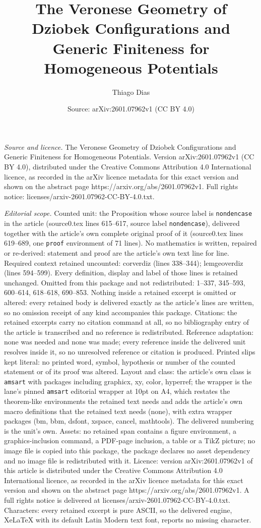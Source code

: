 \documentclass[10pt,a4paper]{amsart}
\title[The Veronese Geometry of Dziobek Configurations and Generic ]{The Veronese Geometry of Dziobek Configurations and Generic Finiteness for Homogeneous Potentials}
\author{Thiago Dias}
\date{Source: arXiv:2601.07962v1 (CC BY 4.0)}
\begin{document}
\maketitle

\noindent\emph{Source and licence.} The Veronese Geometry of Dziobek Configurations and Generic Finiteness for Homogeneous Potentials. Version arXiv:2601.07962v1 (CC BY 4.0), distributed under the Creative Commons Attribution 4.0 International licence, as recorded in the arXiv licence metadata for this exact version and shown on the abstract page https://arxiv.org/abs/2601.07962v1. Full rights notice: licenses/arxiv-2601.07962-CC-BY-4.0.txt.\par\smallskip

\noindent\textit{Editorial scope.} Counted unit: the Proposition whose source label is \texttt{nondencase} in the article (source0.tex lines 615--617, source label \texttt{nondencase}), delivered together with the article's own complete original proof of it (source0.tex lines 619--689, one \texttt{proof} environment of 71 lines). No mathematics is written, repaired or re-derived: statement and proof are the article's own text line for line. Required context retained uncounted: corverdiz (lines 338--344); lemgeoverdiz (lines 594--599). Every definition, display and label of those lines is retained unchanged. Omitted from this package and not redistributed: 1--337, 345--593, 600--614, 618--618, 690--853. Nothing inside a retained excerpt is omitted or altered: every retained body is delivered exactly as the article's lines are written, so no omission receipt of any kind accompanies this package. Citations: the retained excerpts carry no citation command at all, so no bibliography entry of the article is transcribed and no reference is redistributed. Reference adaptation: none was needed and none was made; every reference inside the delivered unit resolves inside it, so no unresolved reference or citation is produced. Printed slips kept literal: no printed word, symbol, hypothesis or number of the counted statement or of its proof was altered. Layout and class: the article's own class is \texttt{amsart} with packages including graphicx, xy, color, hyperref; the wrapper is the lane's pinned \texttt{amsart} editorial wrapper at 10pt on A4, which restates the theorem-like environments the retained text needs and adds the article's own macro definitions that the retained text needs (none), with extra wrapper packages (bm, bbm, dsfont, xspace, cancel, mathtools). The delivered numbering is the unit's own. Assets: no retained span contains a figure environment, a graphics-inclusion command, a PDF-page inclusion, a table or a TikZ picture; no image file is copied into this package, the package declares no asset dependency and no image file is redistributed with it. Licence: version arXiv:2601.07962v1 of this article is distributed under the Creative Commons Attribution 4.0 International licence, as recorded in the arXiv licence metadata for this exact version and shown on the abstract page https://arxiv.org/abs/2601.07962v1. A full rights notice is delivered at licenses/arxiv-2601.07962-CC-BY-4.0.txt. Characters: every retained excerpt is pure ASCII, so the delivered engine, XeLaTeX with its default Latin Modern text font, reports no missing character.
\end{document}
